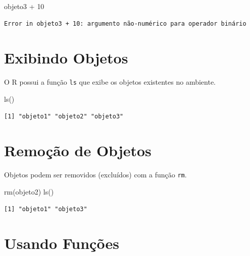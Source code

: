\documentclass[
  letterpaper,
  DIV=11,
  numbers=noendperiod]{scrreprt}
\newenvironment{Shaded}{\begin{snugshade}}{\end{snugshade}}
\newcommand{\DecValTok}[1]{\textcolor[rgb]{0.68,0.00,0.00}{#1}}
\newcommand{\FunctionTok}[1]{\textcolor[rgb]{0.28,0.35,0.67}{#1}}
\newcommand{\NormalTok}[1]{\textcolor[rgb]{0.00,0.23,0.31}{#1}}
\newcommand{\SpecialCharTok}[1]{\textcolor[rgb]{0.37,0.37,0.37}{#1}}
\begin{document}
\begin{Shaded}
\begin{Highlighting}[]
\NormalTok{objeto3 }\SpecialCharTok{+} \DecValTok{10}
\end{Highlighting}
\end{Shaded}

\begin{verbatim}
Error in objeto3 + 10: argumento não-numérico para operador binário
\end{verbatim}

\hypertarget{exibindo-objetos}{%
\section{Exibindo Objetos}\label{exibindo-objetos}}

O R possui a função \texttt{ls} que exibe os objetos existentes no
ambiente.

\begin{Shaded}
\begin{Highlighting}[]
\FunctionTok{ls}\NormalTok{()}
\end{Highlighting}
\end{Shaded}

\begin{verbatim}
[1] "objeto1" "objeto2" "objeto3"
\end{verbatim}

\hypertarget{remouxe7uxe3o-de-objetos}{%
\section{Remoção de Objetos}\label{remouxe7uxe3o-de-objetos}}

Objetos podem ser removidos (excluídos) com a função \texttt{rm}.

\begin{Shaded}
\begin{Highlighting}[]
\FunctionTok{rm}\NormalTok{(objeto2)}
\FunctionTok{ls}\NormalTok{()}
\end{Highlighting}
\end{Shaded}

\begin{verbatim}
[1] "objeto1" "objeto3"
\end{verbatim}

\hypertarget{usando-funuxe7uxf5es}{%
\section{Usando Funções}\label{usando-funuxe7uxf5es}}
\end{document}
